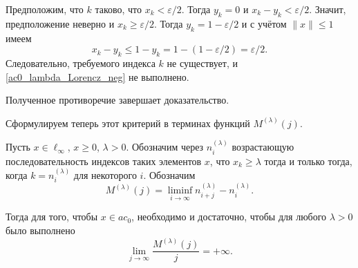 Предположим, что $k$ таково, что $x_k < \varepsilon/2$.
Тогда $y_k = 0$ и $x_k - y_k < \varepsilon/2$.
Значит, предположение неверно и $x_k \geq \varepsilon/2$.
Тогда $y_k = 1-\varepsilon/2$ и с учётом $\|x\|\leq 1$ имеем
\begin{equation}
	x_k - y_k \leq 1- y_k = 1 - (1-\varepsilon/2) = \varepsilon/2
	.
\end{equation}
Следовательно, требуемого индекса $k$ не существует,
и \eqref{ac0_lambda_Lorencz_neg} не выполнено.

Полученное противоречие завершает доказательство.

Сформулируем теперь этот критерий в терминах функций $M^{(\lambda)}(j)$.

\begin{theorem}
	\label{thm:crit_ac0_Mj_lambda}
	Пусть $x\in\ell_\infty$, $x \geq 0$, $\lambda>0$.
	Обозначим через $n^{(\lambda)}_i$ возрастающую последовательность
	индексов таких элементов $x$, что $x_k \geq \lambda$ тогда и только тогда,
	когда $k=n^{(\lambda)}_i$ для некоторого $i$.
	Обозначим
	\begin{equation}
		M^{(\lambda)}(j) = \liminf_{i\to\infty} n^{(\lambda)}_{i+j} - n^{(\lambda)}_i
		.
	\end{equation}


	Тогда для того, чтобы $x\in ac_0$, необходимо и достаточно, чтобы
	для любого $\lambda>0$ было выполнено
	\begin{equation}
		\lim_{j \to \infty} \frac{M^{(\lambda)}(j)}{j} = +\infty
		.
	\end{equation}
\end{theorem}
